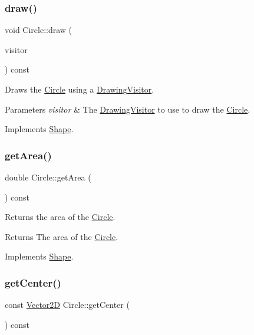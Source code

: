\subsubsection{\texorpdfstring{draw()}{draw()}}
{\footnotesize\ttfamily void Circle\+::draw (\begin{DoxyParamCaption}\item[{\hyperlink{class_drawing_visitor}{Drawing\+Visitor} $\ast$}]{visitor }\end{DoxyParamCaption}) const\hspace{0.3cm}{\ttfamily [virtual]}}

Draws the \hyperlink{class_circle}{Circle} using a \hyperlink{class_drawing_visitor}{Drawing\+Visitor}. 
\begin{DoxyParams}{Parameters}
{\em visitor} & The \hyperlink{class_drawing_visitor}{Drawing\+Visitor} to use to draw the \hyperlink{class_circle}{Circle}. \\
\hline
\end{DoxyParams}


Implements \hyperlink{class_shape_ae67fc6d39dd33759b65ff6112b21eab7}{Shape}.

\hypertarget{class_circle_a7bfb5ab5c8d4f11890407a2483ad61ee}{}\label{class_circle_a7bfb5ab5c8d4f11890407a2483ad61ee} 
\subsubsection{\texorpdfstring{get\+Area()}{getArea()}}
{\footnotesize\ttfamily double Circle\+::get\+Area (\begin{DoxyParamCaption}{ }\end{DoxyParamCaption}) const\hspace{0.3cm}{\ttfamily [virtual]}}

Returns the area of the \hyperlink{class_circle}{Circle}. \begin{DoxyReturn}{Returns}
The area of the \hyperlink{class_circle}{Circle}. 
\end{DoxyReturn}


Implements \hyperlink{class_shape_ad9454ee04617290547e7529180b1beae}{Shape}.

\hypertarget{class_circle_a4ed140857e0622e97377f60993c4ec44}{}\label{class_circle_a4ed140857e0622e97377f60993c4ec44} 
\subsubsection{\texorpdfstring{get\+Center()}{getCenter()}}
{\footnotesize\ttfamily const \hyperlink{class_vector2_d}{Vector2D} Circle\+::get\+Center (\begin{DoxyParamCaption}{ }\end{DoxyParamCaption}) const}


